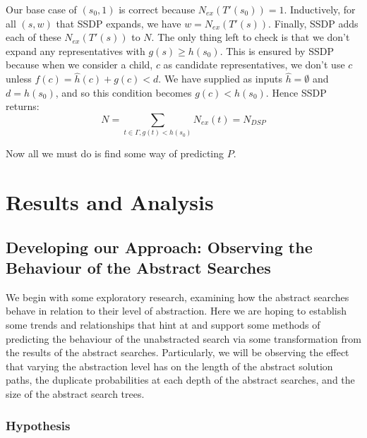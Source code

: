 \documentclass{article}
\begin{document}
Our base case of \((s_0, 1)\) is correct because \(N_{ex}(T'(s_0)) = 1\).
Inductively, for all \((s,w)\) that SSDP expands, we have \(w = N_{ex}(T'(s))\).
Finally, SSDP adds each of these \(N_{ex}(T'(s))\) to \(N\).
The only thing left to check is that we don't expand any representatives with \(g(s) \geq h(s_0)\).
This is ensured by SSDP because when we consider a child, \(c\) as candidate representatives,
we don't use \(c\) unless \(f(c) = \hat{h}(c) + g(c) < d\).
We have supplied as inputs \(\hat{h} = \emptyset\) and \(d = h(s_0)\),
and so this condition becomes \(g(c) < h(s_0)\).
Hence SSDP returns:
\[N = \sum_{t \in \Gamma, g(t) < h(s_0)} N_{ex}(t) = N_{DSP}\]

Now all we must do is find some way of predicting \(P\).


\section{Results and Analysis}

\subsection{Developing our Approach: Observing the Behaviour of the Abstract Searches}

We begin with some exploratory research, examining how the abstract searches behave
in relation to their level of abstraction.
Here we are hoping to establish some trends and relationships that
hint at and support some methods of predicting the behaviour of the unabstracted search
via some transformation from the results of the abstract searches.
Particularly, we will be observing the effect that varying the abstraction level
has on the length of the abstract solution paths,
the duplicate probabilities at each depth of the abstract searches,
and the size of the abstract search trees.

\subsubsection*{Hypothesis}
\end{document}
